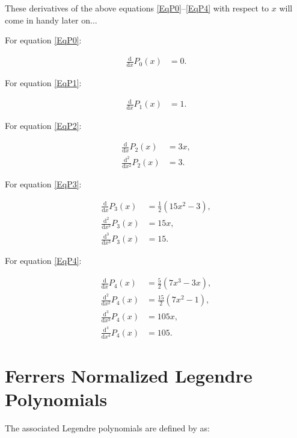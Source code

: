 \documentclass[]{article}
\begin{document}
		These derivatives of the above equations \ref{EqP0}--\ref{EqP4} with respect to $x$ will come in handy later on...
		
		For equation \ref{EqP0}:
		
		\begin{align}
			\frac{\text{d}}{\text{d} x}P_0 (x) &= 0. \label{Eqd1P0}
		\end{align}

		For equation \ref{EqP1}:

		\begin{align}
			\frac{\text{d}}{\text{d} x} P_1 (x) &= 1. \label{Eqd1P1}
		\end{align}
		
		For equation \ref{EqP2}:

		\begin{align}
			\frac{\text{d}}{\text{d} x} P_2 (x) &= 3x, \label{Eqd1P2} \\
			\frac{\text{d}^2}{\text{d} x^2} P_2 (x) &= 3. \label{Eqd2P2}
		\end{align}
		
		For equation \ref{EqP3}:
		
		\begin{align}
			\frac{\text{d}}{\text{d} x} P_3 (x) &= \frac{1}{2}(15x^2 - 3), \label{Eqd1P3} \\
			\frac{\text{d}^2}{\text{d} x^2} P_3 (x) &= 15x, \label{Eqd2P3} \\
			\frac{\text{d}^3}{\text{d} x^3} P_3 (x) &= 15. \label{Eqd3P3}
		\end{align}
		
		For equation \ref{EqP4}:

		\begin{align}
			\frac{\text{d}}{\text{d} x} P_4 (x) &= \frac{5}{2}(7x^3 - 3x), \label{Eqd1P4} \\
			\frac{\text{d}^2}{\text{d} x^2} P_4 (x) &= \frac{15}{2}(7x^2 - 1), \label{Eqd2P4} \\
			\frac{\text{d}^3}{\text{d} x^3} P_4 (x) &= 105x, \label{Eqd3P4} \\
			\frac{\text{d}^4}{\text{d} x^4} P_4 (x) &= 105. \label{Eqd4P4}
		\end{align}
			
\section{Ferrers Normalized Legendre Polynomials}

	The associated Legendre polynomials are defined by \cite{Ferrers1877} as:
	
\end{document}
